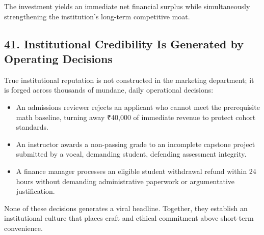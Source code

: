 The investment yields an immediate net financial surplus while simultaneously strengthening the institution's long-term competitive moat.

\subsection*{41. Institutional Credibility Is Generated by Operating Decisions}

True institutional reputation is not constructed in the marketing department; it is forged across thousands of mundane, daily operational decisions:
\begin{itemize}
\item An admissions reviewer rejects an applicant who cannot meet the prerequisite math baseline, turning away ₹40,000 of immediate revenue to protect cohort standards.
\item An instructor awards a non-passing grade to an incomplete capstone project submitted by a vocal, demanding student, defending assessment integrity.
\item A finance manager processes an eligible student withdrawal refund within 24 hours without demanding administrative paperwork or argumentative justification.
\end{itemize}

None of these decisions generates a viral headline. Together, they establish an institutional culture that places craft and ethical commitment above short-term convenience.
